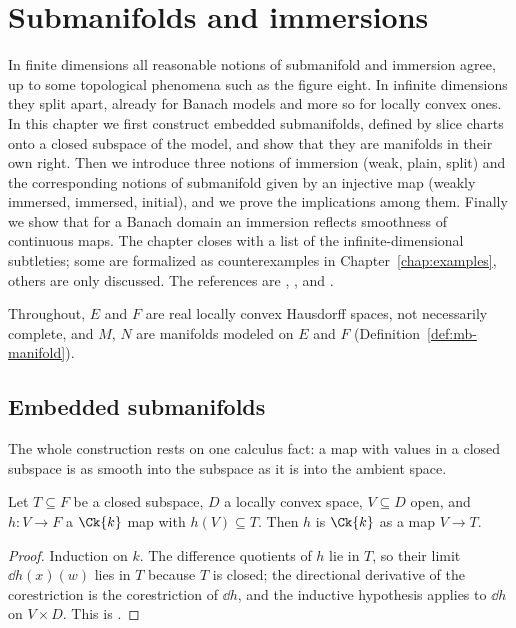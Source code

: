 \chapter{Submanifolds and immersions}
\label{chap:submanifolds}

In finite dimensions all reasonable notions of submanifold and immersion agree, up to some
topological phenomena such as the figure eight. In infinite dimensions they split apart, already
for Banach models and more so for locally convex ones. In this chapter we first construct
embedded submanifolds, defined by slice charts onto a closed subspace of the model, and show that
they are manifolds in their own right. Then we introduce three notions of immersion (weak,
plain, split) and the corresponding notions of submanifold given by an injective map (weakly
immersed, immersed, initial), and we prove the implications among them. Finally we show that
for a Banach domain an immersion reflects smoothness of continuous maps. The chapter closes with
a list of the infinite-dimensional subtleties; some are formalized as counterexamples in
Chapter~\ref{chap:examples}, others are only discussed. The references are
\cite[Def.~3.1.10, Def.~3.3.22, Rem.~3.3.23, Lemma~3.3.24]{GN26}, \cite[\S II.6, \S IV.4]{Nee06},
\cite{KMW24} and \cite[Cap.~2]{Lar26}.

Throughout, $E$ and $F$ are real locally convex Hausdorff spaces, not necessarily complete, and
$M$, $N$ are manifolds modeled on $E$ and $F$ (Definition~\ref{def:mb-manifold}).

\section{Embedded submanifolds}

The whole construction rests on one calculus fact: a map with values in a closed subspace is as
smooth into the subspace as it is into the ambient space.

\begin{lemma}
  \label{lem:sub-codrestrict}
  \leanok
  Let $T \subseteq F$ be a closed subspace, $D$ a locally convex space, $V \subseteq D$ open,
  and $h \colon V \to F$ a
  $\Ck{k}$ map with $h(V) \subseteq T$. Then $h$ is $\Ck{k}$ as a map $V \to T$.
\end{lemma}

\begin{proof}
  \leanok
  Induction on $k$. The difference quotients of $h$ lie in $T$, so their limit $\dd h(x)(w)$
  lies in $T$ because $T$ is closed; the directional derivative of the corestriction is the
  corestriction of $\dd h$, and the inductive hypothesis applies to $\dd h$ on $V \times D$.
  This is \cite[Lemma~1.3.19]{GN26}.
\end{proof}

